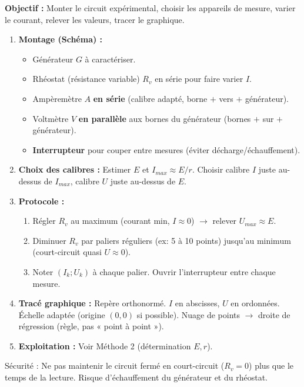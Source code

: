 \documentclass[11pt]{article}
\newcommand{\cle}[1]{{\popxbold\color{popdark}#1}}
\begin{document}
\begin{methode}[Réaliser le montage et tracer la caractéristique $U=f(I)$ d'un générateur]
\textbf{Objectif :} Monter le circuit expérimental, choisir les appareils de mesure, varier le courant, relever les valeurs, tracer le graphique.
\begin{enumerate}
    \item \textbf{Montage (Schéma) :}
        \begin{itemize}
            \item Générateur $G$ à caractériser.
            \item Rhéostat (résistance variable) $R_v$ en série pour faire varier $I$.
            \item Ampèremètre $A$ \textbf{en série} (calibre adapté, borne $+$ vers $+$ générateur).
            \item Voltmètre $V$ \textbf{en parallèle} aux bornes du générateur (bornes $+$ sur $+$ générateur).
            \item \textbf{Interrupteur} pour couper entre mesures (éviter décharge/échauffement).
        \end{itemize}
    \item \textbf{Choix des calibres :} Estimer $E$ et $I_{max} \approx E/r$. Choisir calibre $I$ juste au-dessus de $I_{max}$, calibre $U$ juste au-dessus de $E$.
    \item \textbf{Protocole :}
        \begin{enumerate}
            \item Régler $R_v$ au maximum (courant min, $I \approx 0$) $\rightarrow$ relever $U_{max} \approx E$.
            \item Diminuer $R_v$ par paliers réguliers (ex: 5 à 10 points) jusqu'au minimum (court-circuit quasi $U \approx 0$).
            \item Noter $(I_k ; U_k)$ à chaque palier. Ouvrir l'interrupteur entre chaque mesure.
        \end{enumerate}
    \item \textbf{Tracé graphique :} Repère orthonormé. $I$ en abscisses, $U$ en ordonnées. Échelle adaptée (origine $(0,0)$ si possible). Nuage de points $\rightarrow$ droite de régression (règle, pas « point à point »).
    \item \textbf{Exploitation :} Voir Méthode 2 (détermination $E, r$).
\end{enumerate}
\cle{Sécurité} : Ne pas maintenir le circuit fermé en court-circuit ($R_v=0$) plus que le temps de la lecture. Risque d'échauffement du générateur et du rhéostat.
\end{methode}
\end{document}
